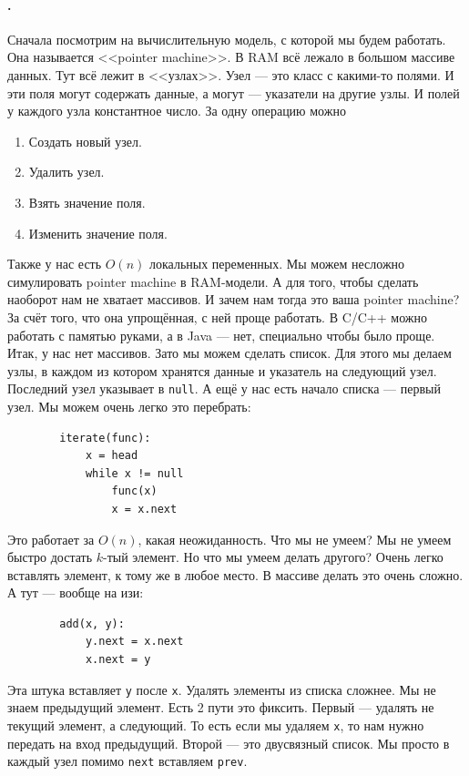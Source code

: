 \documentclass{article}
\newcommand{\pseudo}{PseudoLexer.py:PseudoLexer -x}
\newcommand{\pseudocode}[1]{\texttt{#1}}
\begin{document}
    \paragraph{.}
    Сначала посмотрим на вычислительную модель, с которой мы будем работать. Она называется <<pointer machine>>. В RAM всё лежало в большом массиве данных. Тут всё лежит в <<узлах>>. Узел --- это класс с какими-то полями. И эти поля могут содержать данные, а могут --- указатели на другие узлы. И полей у каждого узла константное число. За одну операцию можно \begin{enumerate}[1)]
        \item Создать новый узел.
        \item Удалить узел.
        \item Взять значение поля.
        \item Изменить значение поля.
    \end{enumerate}
    Также у нас есть $O(n)$ локальных переменных. Мы можем несложно симулировать pointer machine в RAM-модели. А для того, чтобы сделать наоборот нам не хватает массивов. И зачем нам тогда это ваша pointer machine? За счёт того, что она упрощённая, с ней проще работать. В C/C++ можно работать с памятью руками, а в Java --- нет, специально чтобы было проще. Итак, у нас нет массивов. Зато мы можем сделать список. Для этого мы делаем узлы, в каждом из котором хранятся данные и указатель на следующий узел. Последний узел указывает в \texttt{null}. А ещё у нас есть начало списка --- первый узел. Мы можем очень легко это перебрать:
    \begin{verbatim}
        iterate(func):
            x = head
            while x != null
                func(x)
                x = x.next
    \end{verbatim}
    Это работает за $O(n)$, какая неожиданность. Что мы не умеем? Мы не умеем быстро достать $k$-тый элемент. Но что мы умеем делать другого? Очень легко вставлять элемент, к тому же в любое место. В массиве делать это очень сложно. А тут --- вообще на изи:
    \begin{verbatim}
        add(x, y):
            y.next = x.next
            x.next = y
    \end{verbatim}
    Эта штука вставляет \pseudocode{y} после \pseudocode{x}. Удалять элементы из списка сложнее. Мы не знаем предыдущий элемент. Есть 2 пути это фиксить. Первый --- удалять не текущий элемент, а следующий. То есть если мы удаляем \pseudocode{x}, то нам нужно передать на вход предыдущий. Второй --- это двусвязный список. Мы просто в каждый узел помимо \pseudocode{next} вставляем \pseudocode{prev}.
\end{document}
